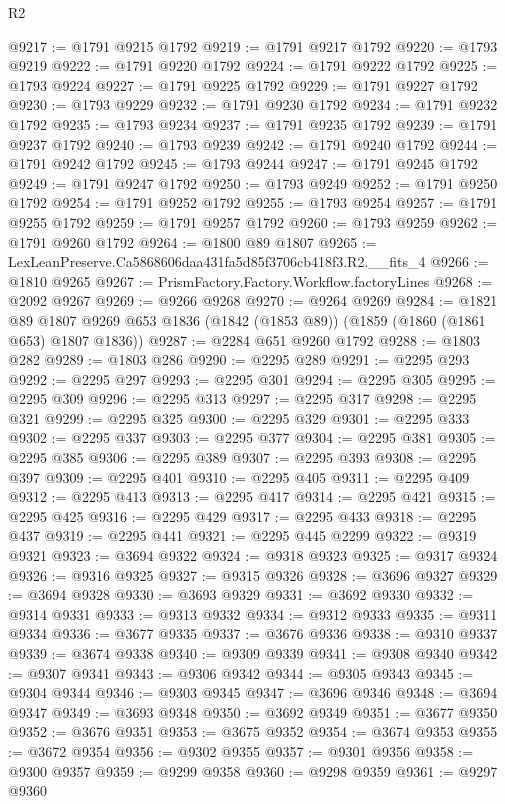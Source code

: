 \begin{lexlean}{R2}
\begin{coremodule}
@9217 := @1791 @9215 @1792
@9219 := @1791 @9217 @1792
@9220 := @1793 @9219
@9222 := @1791 @9220 @1792
@9224 := @1791 @9222 @1792
@9225 := @1793 @9224
@9227 := @1791 @9225 @1792
@9229 := @1791 @9227 @1792
@9230 := @1793 @9229
@9232 := @1791 @9230 @1792
@9234 := @1791 @9232 @1792
@9235 := @1793 @9234
@9237 := @1791 @9235 @1792
@9239 := @1791 @9237 @1792
@9240 := @1793 @9239
@9242 := @1791 @9240 @1792
@9244 := @1791 @9242 @1792
@9245 := @1793 @9244
@9247 := @1791 @9245 @1792
@9249 := @1791 @9247 @1792
@9250 := @1793 @9249
@9252 := @1791 @9250 @1792
@9254 := @1791 @9252 @1792
@9255 := @1793 @9254
@9257 := @1791 @9255 @1792
@9259 := @1791 @9257 @1792
@9260 := @1793 @9259
@9262 := @1791 @9260 @1792
@9264 := @1800 @89 @1807
@9265 := LexLeanPreserve.Ca5868606daa431fa5d85f3706cb418f3.R2.__fits_4
@9266 := @1810 @9265
@9267 := PrismFactory.Factory.Workflow.factoryLines
@9268 := @2092 @9267
@9269 := @9266 @9268
@9270 := @9264 @9269
@9284 := @1821
    @89
    @1807
    @9269
    @653
    @1836
    (@1842 (@1853 @89))
    (@1859 (@1860 (@1861 @653) @1807 @1836))
@9287 := @2284 @651 @9260 @1792
@9288 := @1803 @282
@9289 := @1803 @286
@9290 := @2295 @289
@9291 := @2295 @293
@9292 := @2295 @297
@9293 := @2295 @301
@9294 := @2295 @305
@9295 := @2295 @309
@9296 := @2295 @313
@9297 := @2295 @317
@9298 := @2295 @321
@9299 := @2295 @325
@9300 := @2295 @329
@9301 := @2295 @333
@9302 := @2295 @337
@9303 := @2295 @377
@9304 := @2295 @381
@9305 := @2295 @385
@9306 := @2295 @389
@9307 := @2295 @393
@9308 := @2295 @397
@9309 := @2295 @401
@9310 := @2295 @405
@9311 := @2295 @409
@9312 := @2295 @413
@9313 := @2295 @417
@9314 := @2295 @421
@9315 := @2295 @425
@9316 := @2295 @429
@9317 := @2295 @433
@9318 := @2295 @437
@9319 := @2295 @441
@9321 := @2295 @445 @2299
@9322 := @9319 @9321
@9323 := @3694 @9322
@9324 := @9318 @9323
@9325 := @9317 @9324
@9326 := @9316 @9325
@9327 := @9315 @9326
@9328 := @3696 @9327
@9329 := @3694 @9328
@9330 := @3693 @9329
@9331 := @3692 @9330
@9332 := @9314 @9331
@9333 := @9313 @9332
@9334 := @9312 @9333
@9335 := @9311 @9334
@9336 := @3677 @9335
@9337 := @3676 @9336
@9338 := @9310 @9337
@9339 := @3674 @9338
@9340 := @9309 @9339
@9341 := @9308 @9340
@9342 := @9307 @9341
@9343 := @9306 @9342
@9344 := @9305 @9343
@9345 := @9304 @9344
@9346 := @9303 @9345
@9347 := @3696 @9346
@9348 := @3694 @9347
@9349 := @3693 @9348
@9350 := @3692 @9349
@9351 := @3677 @9350
@9352 := @3676 @9351
@9353 := @3675 @9352
@9354 := @3674 @9353
@9355 := @3672 @9354
@9356 := @9302 @9355
@9357 := @9301 @9356
@9358 := @9300 @9357
@9359 := @9299 @9358
@9360 := @9298 @9359
@9361 := @9297 @9360

\end{coremodule}
\end{lexlean}
